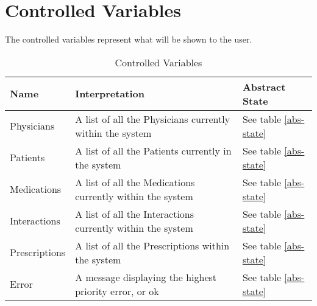 \section{Controlled Variables}
The controlled variables represent what will be shown to the user.

\begin{table}[h]
\centering
\begin{tabular}{|l|l|l|}
\hline
Name          & Interpretation                                             & Abstract State \\ \hline
Physicians    & A list of all the Physicians currently within the system   & See table \ref{abs-state}  \\ \hline
Patients      & A list of all the Patients currently in the system         & See table \ref{abs-state}  \\ \hline
Medications   & A list of all the Medications currently within the system  & See table \ref{abs-state}  \\ \hline
Interactions  & A list of all the Interactions currently within the system & See table \ref{abs-state}  \\ \hline
Prescriptions & A list of all the Prescriptions within the system          & See table \ref{abs-state}  \\ \hline
Error         & A message displaying the highest priority error, or ok     & See table \ref{abs-state}  \\ \hline
\end{tabular}
\caption {Controlled Variables}
\label{tbl:cv}
\end{table}